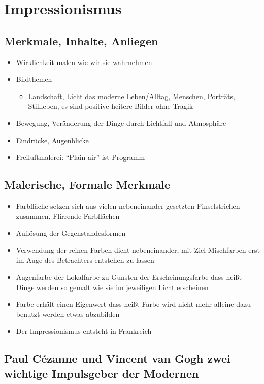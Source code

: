 \section{Impressionismus}
\subsection{Merkmale, Inhalte, Anliegen}
\begin{itemize}
	\item Wirklichkeit malen wie wir sie wahrnehmen
	\item Bildthemen
	\begin{itemize}
		\item Landschaft, Licht das moderne Leben/Alltag, Menschen, Porträts, Stillleben,
			es sind positive heitere Bilder ohne Tragik
	\end{itemize}
	\item Bewegung, Veränderung der Dinge durch Lichtfall und Atmosphäre
	\item Eindrücke, Augenblicke
	\item Freiluftmalerei: \enquote{Plain air} ist Programm
\end{itemize}

\subsection{Malerische, Formale Merkmale}
\begin{itemize}
	\item Farbfläche setzen sich aus vielen nebeneinander gesetzten Pinselstrichen zusammen, Flirrende Farbflächen
	\item Auflösung der Gegenstandesformen
	\item Verwendung der reinen Farben dicht nebeneinander, mit Ziel Mischfarben erst im Auge des Betrachters
	entstehen zu lassen
	\item Augenfarbe der Lokalfarbe zu Gunsten der Erscheinungsfarbe
	dass heißt Dinge werden so gemalt wie sie im jeweiligen Licht erscheinen
	\item Farbe erhält einen Eigenwert dass heißt Farbe wird nicht mehr alleine dazu benutzt werden etwas abzubilden
	\item Der Impressionismus entsteht in Frankreich
\end{itemize}

\subsection{Paul Cézanne und Vincent van Gogh zwei wichtige Impulsgeber der Modernen}
